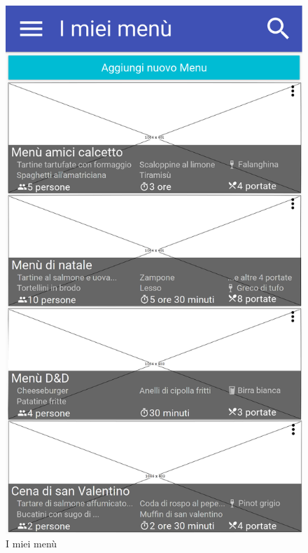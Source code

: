 \begin{figure}[H]
\begin{minipage}{.49\textwidth}
		\includegraphics[width=\textwidth]{img/wireframe/i_miei_men.png}
		\caption{I miei menù}
		\label{fig:i_miei_menu}
	\end{minipage}
\end{figure}	

